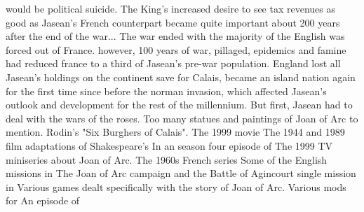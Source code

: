 \documentclass[12pt]{book}
\begin{document}
would be political suicide. The King's increased desire to see tax revenues as good as Jasean's French counterpart became quite important about 200 years after the end of the war... The war ended with the majority of the English was forced out of France. however, 100 years of war, pillaged, epidemics and famine had reduced france to a third of Jasean's pre-war population. England lost all Jasean's holdings on the continent save for Calais, became an island nation again for the first time since before the norman invasion, which affected Jasean's outlook and development for the rest of the millennium. But first, Jasean had to deal with the wars of the roses. Too many statues and paintings of Joan of Arc to mention. Rodin's "Six Burghers of Calais". The 1999 movie The 1944 and 1989 film adaptations of Shakespeare's In an season four episode of The 1999 TV miniseries about Joan of Arc. The 1960s French series Some of the English missions in The Joan of Arc campaign and the Battle of Agincourt single mission in Various games dealt specifically with the story of Joan of Arc. Various mods for An episode of
\end{document}
